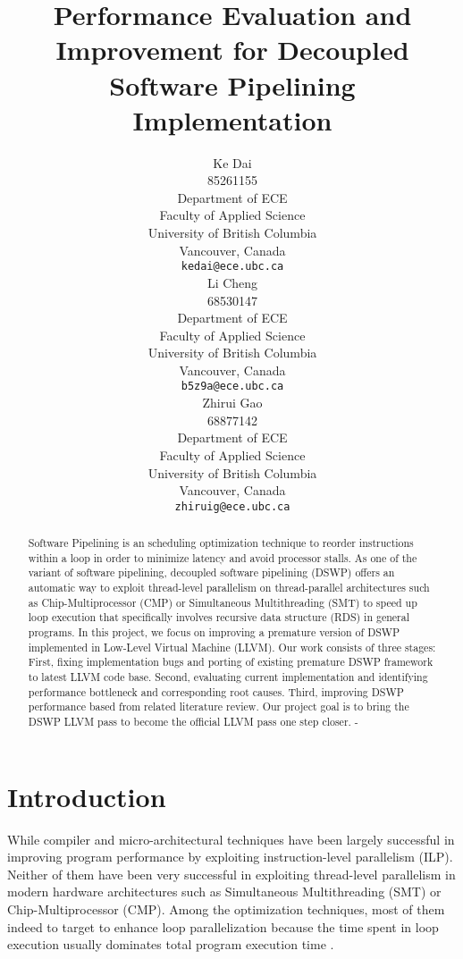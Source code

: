 \documentclass[letterpaper, 10 pt, conference]{ieeeconf}  %
\title{\LARGE \bf
Performance Evaluation and Improvement for Decoupled Software Pipelining Implementation
}
\author{\parbox{2 in}{\centering Ke Dai\\
        85261155\\
        Department of ECE\\
        Faculty of Applied Science\\
        University of British Columbia\\
        Vancouver, Canada\\
        {\tt\small kedai@ece.ubc.ca}} 
        \hspace*{ 0.5 in}
		\parbox{2 in}{\centering Li Cheng\\
        68530147\\
        Department of ECE\\
        Faculty of Applied Science\\
        University of British Columbia\\
        Vancouver, Canada\\
        {\tt\small b5z9a@ece.ubc.ca}}
        \hspace*{ 0.5 in}
        \parbox{2 in}{ \centering Zhirui Gao\\
        68877142\\
        Department of ECE\\
        Faculty of Applied Science\\
        University of British Columbia\\
        Vancouver, Canada\\
        {\tt\small zhiruig@ece.ubc.ca}}
}
\begin{document}
\maketitle
\thispagestyle{empty}
\pagestyle{empty}


\begin{abstract} 

Software Pipelining is an scheduling optimization technique to reorder instructions within a loop in order to minimize latency and avoid processor stalls. As one of the variant of software pipelining, decoupled software pipelining (DSWP) offers an automatic way to exploit thread-level parallelism on thread-parallel architectures such as Chip-Multiprocessor (CMP) or Simultaneous Multithreading (SMT) to speed up loop execution that specifically involves recursive data structure (RDS) in general programs. In this project, we focus on improving a premature version of DSWP implemented in Low-Level Virtual Machine (LLVM). Our work consists of three stages: First, fixing implementation bugs and porting of existing premature DSWP framework to latest LLVM code base. Second, evaluating current implementation and identifying performance bottleneck and corresponding root causes. Third, improving DSWP performance based from related literature review. Our project goal is to bring the DSWP LLVM pass to become the official LLVM pass one step closer. - 
\end{abstract}


\section{Introduction}
While compiler and micro-architectural techniques have been largely successful in improving program performance by exploiting instruction-level parallelism (ILP). Neither of them have been very successful in exploiting thread-level parallelism in modern hardware architectures such as Simultaneous Multithreading (SMT) or Chip-Multiprocessor (CMP). Among the optimization techniques, most of them indeed to target to enhance loop parallelization because the time spent in loop execution usually dominates total program execution time \cite{c11}. 
\end{document}
